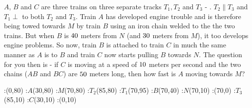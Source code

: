 


\question[4] $A$, $B$ and $C$ are three trains on three separate tracks $T_1, T_2$ and $T_3$
- \asif. $T_2\parallel T_3$ and $T_1\perp$ to both $T_2$ and $T_3$. Train $A$ has developed engine 
trouble and is therefore being towed towards $M$ by train $B$ using an iron chain welded to the 
the two trains. But when $B$ is $40$ meters from $N$ (and $30$ meters from $M$), it too
develops engine problems. So now, train $B$ is attached to train $C$ in much the same manner 
as $A$ is to $B$ and train $C$ now starts pulling $B$ towards $N$. The question for you then is
- if $C$ is moving at a speed of $10$ meters per second and the two chains ($AB$ and $BC$)
are $50$ meters long, then how fast is $A$ moving towards $M$?


\watchout[-5cm]

  \begin{marginfigure}[-4cm]
      :(0,80) %
      :$A$(30,80)
      :$M$(70,80)
      :$T_2$(85,80)
      :$T_1$(70,95) %
      :$B$(70,40)
      :$N$(70,10)
      :(70,0)
      :$T_3$(85,10) %
      :$C$(30,10)
      :(0,10)
    \figdrawbegin{}
      \figdrawline [100,101,102,103]
      \figdrawline [104,105,106,107]
      \figdrawline [108,109,110]
      \figdrawline [101,105,109]
    \figdrawend
    \centerline{\box\figBoxA}
  \end{marginfigure}


